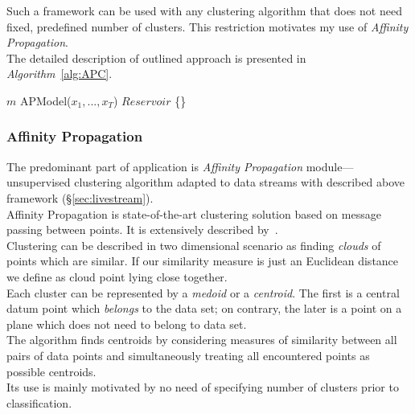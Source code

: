 \documentclass[11pt, letterpaper]{article}            %
\begin{document}
Such a framework can be used with any clustering algorithm that does not need fixed, predefined number of clusters. This restriction motivates my use of \emph{Affinity Propagation}.\\

\noindent The detailed description of outlined approach is presented in \emph{Algorithm}~\ref{alg:APC}.\\

\SetAlCapSkip{1em}
\LinesNumbered
{}
\vspace{2cm}
\begin{algorithm}[h]

  $m$ \leftarrow APModel($x_1, ..., x_T$)\;
  $Reservoir$ \leftarrow \{\}\;

\end{algorithm}
\vspace{1cm}


\subsubsection{Affinity Propagation}
The predominant part of application is \emph{Affinity Propagation} module---unsupervised clustering algorithm adapted to data streams with described above framework (§\ref{sec:livestream}).\\

Affinity Propagation is state-of-the-art clustering solution based on message passing between points. It is extensively described by~\citep{frey07affinitypropagation}.\\
Clustering can be described in two dimensional scenario as finding \emph{clouds} of points which are similar. If our similarity measure is just an Euclidean distance we define as cloud point lying close together.\\
Each cluster can be represented by a \emph{medoid} or a \emph{centroid}. The first is a central datum point which \emph{belongs} to the data set; on contrary, the later is a point on a plane which does not need to belong to data set.\\
The algorithm finds centroids by considering measures of similarity between all pairs of data points and simultaneously treating all encountered points as possible centroids.\\
Its use is mainly motivated by no need of specifying number of clusters prior to classification.\\
\end{document}
